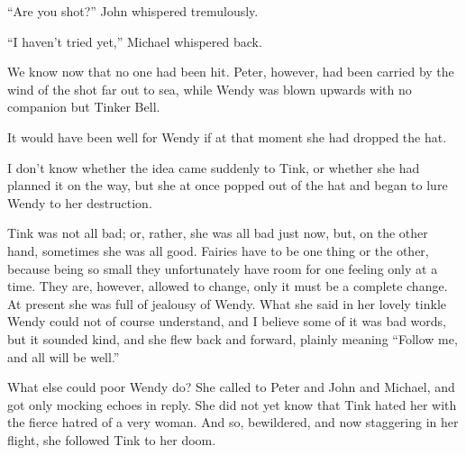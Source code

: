 ``Are you shot?'' John whispered tremulously.

``I haven't tried yet,'' Michael whispered back.

We know now that no one had been hit.
Peter, however, had been carried by the wind of the shot far out to sea, while
Wendy was blown upwards with no companion but Tinker Bell.

It would have been well for Wendy if at that moment she had dropped the hat.

I don't know whether the idea came suddenly to Tink, or whether she had planned
it on the way, but she at once popped out of the hat and began to lure Wendy to
her destruction.

Tink was not all bad; or, rather, she was all bad just now, but, on the other
hand, sometimes she was all good.
Fairies have to be one thing or the other, because being so small they
unfortunately have room for one feeling only at a time.
They are, however, allowed to change, only it must be a complete change.
At present she was full of jealousy of Wendy.
What she said in her lovely tinkle Wendy could not of course understand, and I
believe some of it was bad words, but it sounded kind, and she flew back and
forward, plainly meaning ``Follow me, and all will be well.''

What else could poor Wendy do?
She called to Peter and John and Michael, and got only mocking echoes in reply.
She did not yet know that Tink hated her with the fierce hatred of a very woman.
And so, bewildered, and now staggering in her flight, she followed Tink to her
doom.
